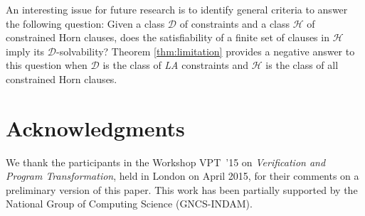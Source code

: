 \documentclass[english]{tlp}
\begin{document}
An interesting issue for future research is 
to identify general criteria to answer the following question:
Given a class $\mathcal D$ of constraints and a class $\mathcal H$
of constrained Horn clauses, does the satisfiability
of a finite set of clauses in $\mathcal H$ 
imply its \mbox{$\mathcal D$-solvability?}
Theorem \ref{thm:limitation} provides a negative answer to this question when
$\mathcal D$ is the class of {\it LA} constraints and
$\mathcal H$ is the class of all constrained Horn clauses.



\section{Acknowledgments}

We thank the participants in the Workshop VPT~'15 on
{\it Verification and Program Transformation}, held in London on April 2015, 
for their comments on a preliminary version of this paper.
This work has been partially supported by the National Group of 
Computing Science (GNCS-INDAM).
\end{document}
